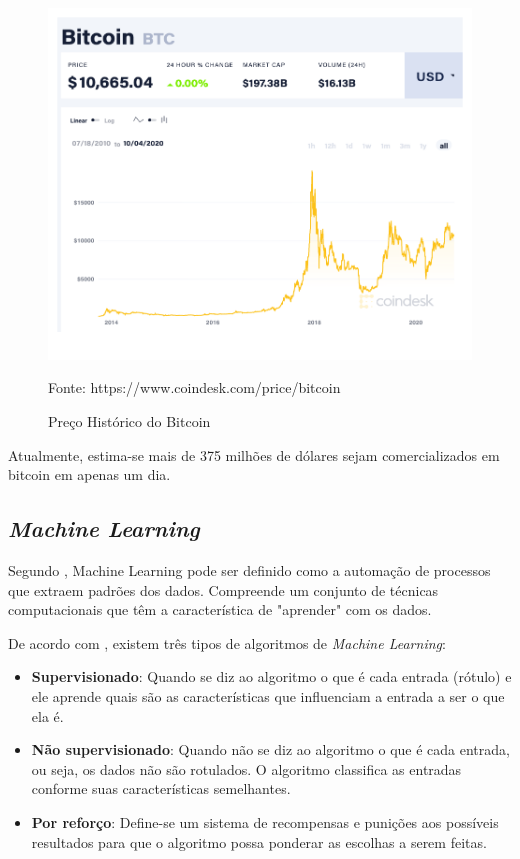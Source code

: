 \documentclass[12pt]{article}
\begin{document}
\begin{figure}[ht]
  \centering
  \includegraphics[scale=0.4]{img/btc-chart.png}
  \caption{Preço Histórico do Bitcoin}
  Fonte: https://www.coindesk.com/price/bitcoin
  \label{fig:btc-chart}
\end{figure}

Atualmente, estima-se mais de 375 milhões de dólares sejam comercializados em
bitcoin em apenas um dia.

\subsection{\textit{Machine Learning}}

Segundo \cite{kelleher2020fundamentals}, Machine Learning pode ser definido como 
a automação de processos que extraem padrões dos dados. Compreende um conjunto 
de técnicas computacionais que têm a característica de "aprender" com os dados.

De acordo com \cite{tanaka:2018}, existem três tipos de algoritmos de 
\textit{Machine Learning}:

\begin{itemize}
  \item \textbf{Supervisionado}: Quando se diz ao algoritmo o que é cada entrada 
  (rótulo) e ele aprende quais são as características que influenciam a entrada
  a ser o que ela é.
  \item \textbf{Não supervisionado}: Quando não se diz ao algoritmo o que é cada
  entrada, ou seja, os dados não são rotulados. O algoritmo classifica as 
  entradas conforme suas características semelhantes.
  \item \textbf{Por reforço}: Define-se um sistema de recompensas e punições aos 
  possíveis resultados para que o algoritmo possa ponderar as escolhas a serem 
  feitas.
\end{itemize}
\end{document}
